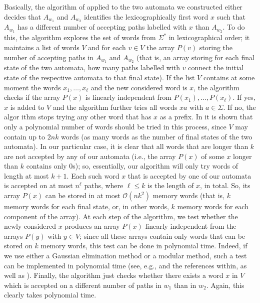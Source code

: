 \documentclass[runningheads]{llncs}
\newcommand{\bigo}{{\mathcal{O}}}
\begin{document}
Basically, the algorithm of \cite{siamNFA} applied to the two automata we constructed either decides that $A_{w_1}$ and $A_{w_2}$ identifies the lexicographically first word $x$ such that $A_{w_1}$ has a different number of accepting paths labelled with $x$ than $A_{w_2}$. To do this, the algorithm explores the set of words from $\Sigma^*$ in lexicographical order; it maintains a list of words $V$ and for each $v\in V$ the array $P(v)$ storing the number of accepting paths in $A_{w_1}$ and $A_{w_2}$ (that is, an array storing for each final state of the two automata, how many paths labelled with $v$ connect the initial state of the respective automata to that final state). If the list $V$ contains at some moment the words $x_1,\ldots,x_\ell$ and the new considered word is $x$, the algorithm checks if the array $P(x)$ is linearly independent from $P(x_1), \ldots, P(x_\ell)$. If yes, $x$ is added to $V$ and the algorithm further tries all words $xa$ with $a\in \Sigma$. If no, the algor
 ithm stops trying any other word that has $x$ as a prefix. In \cite{siamNFA} it is shown that only a polynomial number of words should be tried in this process, since $V$ may contain up to $2nk$ words (as many words as the number of final states of the two automata). In our particular case, it is clear that all words that are longer than $k$ are not accepted by any of our automata (i.e., the array $P(x)$ of some $x$ longer than $k$ contains only $0$s); so, essentially, our algorithm will only try words of length at most $k+1$. Each such word $x$ that is accepted by one of our automata is accepted on at most $n^\ell$ paths, where $\ell\leq k$ is the length of $x$, in total. So, its array $P(x)$ can be stored in at most $\bigo(nk^2)$ memory words (that is, $k$ memory words for each final state, or, in other words, $k$ memory words for each component of the array). At each step of the algorithm, we test whether the newly considered $x$ produces an array $P(x)$ linearly independent from
  the arrays $P(y)$ with $y\in V$; since all these arrays contain only words that can be stored on $k$ memory words, this test can be done in polynomial time. Indeed, if we use either  a Gaussian elimination method or a modular method, such a test can be implemented in polynomial time (see, e.g., \cite{mulders} and the references within, as well as \cite{Gathen}). Finally, the algorithm just checks whether there exists a word $x$ in $V$ which is accepted on a different number of paths in $w_1$ than in $w_2$. Again, this clearly takes polynomial time. 
\end{document}
